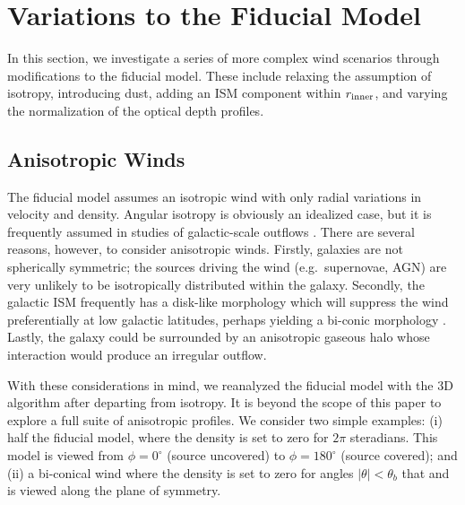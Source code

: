 \documentclass[12pt,preprint]{aastex}
\begin{document}
\section{Variations to the Fiducial Model}
\label{sec:variants}

In this section, we investigate a series of more complex wind
scenarios
through modifications to the fiducial model.  These include relaxing
the assumption of isotropy, introducing dust, adding an ISM
component within $r_{\rm inner}$, and varying the normalization of the
optical depth profiles.

\subsection{Anisotropic Winds}
\label{sec:anisotropic}

The fiducial model assumes an
isotropic wind with only radial variations in velocity and density. 
Angular isotropy is obviously an idealized case, but
it is frequently assumed in studies of galactic-scale outflows
\citep[e.g.][]{steidel+10}.   There are several reasons, however, to
consider anisotropic winds.  Firstly, galaxies are not spherically
symmetric;  the sources driving the
wind (e.g.\ supernovae, AGN) are very unlikely to be isotropically distributed
within the galaxy.  
Secondly, the galactic ISM frequently has a disk-like morphology
which will suppress the wind preferentially at low galactic latitudes,
perhaps yielding a bi-conic morphology \citep[e.g.][]{M87}.
Lastly, the galaxy could be surrounded by an
anisotropic gaseous halo whose interaction would produce an irregular 
outflow.

With these considerations in mind, we reanalyzed the fiducial model
with the 3D algorithm after departing from isotropy.  It is beyond the
scope of this paper to explore a full suite of anisotropic profiles.
We consider two simple examples: (i) half the fiducial model, where 
the density is set to zero for $2\pi$ steradians.  This model is
viewed from $\phi = 0^\circ$ (source uncovered) 
to $\phi = 180^\circ$ (source covered); and 
(ii) a bi-conical wind where the density is set to zero for angles
$|\theta| < \theta_b$ that and is viewed along the plane of symmetry.
\end{document}
